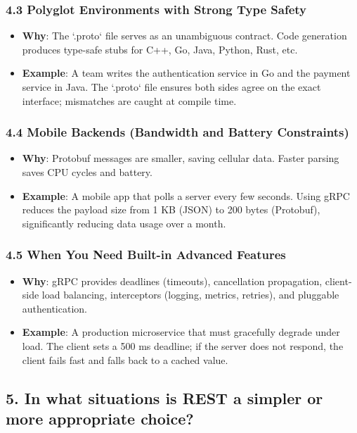 \documentclass[a4paper]{article}
\begin{document}
\subsubsection{4.3 Polyglot Environments with Strong Type Safety}
\begin{itemize}
    \item \textbf{Why}: The `.proto` file serves as an unambiguous contract. Code generation produces type-safe stubs for C++, Go, Java, Python, Rust, etc.
    \item \textbf{Example}: A team writes the authentication service in Go and the payment service in Java. The `.proto` file ensures both sides agree on the exact interface; mismatches are caught at compile time.
\end{itemize}

\subsubsection{4.4 Mobile Backends (Bandwidth and Battery Constraints)}
\begin{itemize}
    \item \textbf{Why}: Protobuf messages are smaller, saving cellular data. Faster parsing saves CPU cycles and battery.
    \item \textbf{Example}: A mobile app that polls a server every few seconds. Using gRPC reduces the payload size from 1 KB (JSON) to 200 bytes (Protobuf), significantly reducing data usage over a month.
\end{itemize}

\subsubsection{4.5 When You Need Built-in Advanced Features}
\begin{itemize}
    \item \textbf{Why}: gRPC provides deadlines (timeouts), cancellation propagation, client-side load balancing, interceptors (logging, metrics, retries), and pluggable authentication.
    \item \textbf{Example}: A production microservice that must gracefully degrade under load. The client sets a 500 ms deadline; if the server does not respond, the client fails fast and falls back to a cached value.
\end{itemize}

\subsection{5. In what situations is REST a simpler or more appropriate choice?}
\end{document}
